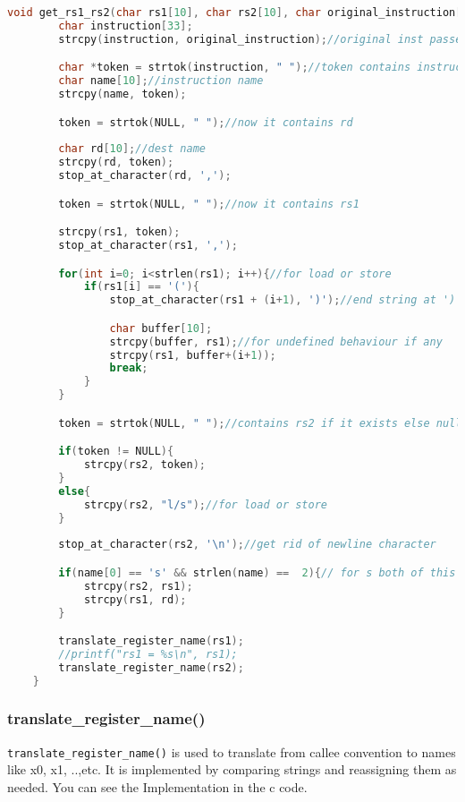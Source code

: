 \documentclass{article}
\begin{document}
\begin{lstlisting}[language=C, caption={get\_rs1\_rs2 function}, label={code-get-rs1-rs2}, backgroundcolor=\color{codebackground}]
    void get_rs1_rs2(char rs1[10], char rs2[10], char original_instruction[33]){
        char instruction[33];
        strcpy(instruction, original_instruction);//original inst passed by ref, so cannot make changes 

        char *token = strtok(instruction, " ");//token contains instruction name
        char name[10];//instruction name 
        strcpy(name, token);

        token = strtok(NULL, " ");//now it contains rd
        
        char rd[10];//dest name
        strcpy(rd, token);
        stop_at_character(rd, ',');

        token = strtok(NULL, " ");//now it contains rs1

        strcpy(rs1, token);
        stop_at_character(rs1, ',');

        for(int i=0; i<strlen(rs1); i++){//for load or store
            if(rs1[i] == '('){
                stop_at_character(rs1 + (i+1), ')');//end string at ')'

                char buffer[10];
                strcpy(buffer, rs1);//for undefined behaviour if any
                strcpy(rs1, buffer+(i+1));
                break;
            }
        }

        token = strtok(NULL, " ");//contains rs2 if it exists else null

        if(token != NULL){
            strcpy(rs2, token);
        }
        else{
            strcpy(rs2, "l/s");//for load or store
        }
        
        stop_at_character(rs2, '\n');//get rid of newline character

        if(name[0] == 's' && strlen(name) ==  2){// for s both of this are sources and not dest
            strcpy(rs2, rs1);
            strcpy(rs1, rd);
        }

        translate_register_name(rs1);
        //printf("rs1 = %s\n", rs1);
        translate_register_name(rs2);
    }
\end{lstlisting}

\subsubsection{translate\_register\_name()}
\texttt{translate\_register\_name()} is used to translate from callee convention to names like x0, x1, ..,etc. It is implemented by comparing strings and reassigning them as needed. You can see the Implementation in the c code.
\end{document}
